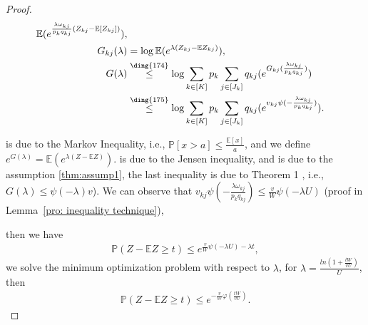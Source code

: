 \documentclass{article}
\def\eE{\mathbb{E}}
\def\pP{\mathbb{P}}
\def\leqthree{\overset{\text{\ding{174}}}{\leq}}
\def\leqfour{\overset{\text{\ding{175}}}{\leq}}
\begin{document}
\begin{proof}
\begin{align*}
        \eE(e^{\frac{\lambda \omega_{kj}}{p_k q_{kj}}(Z_{kj}- \eE [Z_{kj}]) }) ,\\   
        G_{kj}(\lambda ) & = \log \eE (e^{\lambda (Z_{kj}- \eE Z_{kj})}), \\
        G(\lambda ) & \leqthree \log \sum_{k \in [K]}p_k\sum_{j \in [J_k]}q_{kj} (e^{ G_{kj} ({\frac{\lambda \omega_{kj}}{p_k q_{kj}} })}) \\
        & \leqfour \log \sum_{k \in [K]}p_k\sum_{j \in [J_k]}q_{kj} (e^{ v_{kj} \psi (-{\frac{\lambda \omega_{kj}}{p_k q_{kj}} })}).
    \end{align*}

 is due to the Markov Inequality, i.e., $\pP [x > a] \leq \frac{\eE[x]}{a}$, and we define $e^{G(\lambda) } = \eE (e^{\lambda (Z - \eE Z)}) $.  is due to the Jensen inequality, and  is due to the assumption \ref{thm:assump1}, the last inequality  is due to Theorem 1 \cite{bousquet2002bennett,bousquet2003concentration}, i.e., $G(\lambda) \leq \psi(-\lambda)v $). We can observe that $ v_{kj} \psi (-{\frac{\lambda \omega_{kj}}{p_k q_{kj}} }) \leq \frac{v}{W} \psi (-\lambda U)$ (proof in Lemma~\ref{pro: inequality technique}),

then we have
\begin{align}
    \pP(Z-\eE Z \geq t) \leq e^{\frac{v}{W} \psi (-\lambda U) - \lambda t},
\end{align}
we solve the minimum optimization problem with respect to $\lambda$, for $\lambda = \frac{ln(1+\frac{tW}{vU})}{U}$, then
\begin{align}
    \pP (Z- \eE Z \geq t) \leq e^{-\frac{v}{W} \varphi (\frac{tW}{vU})}.
\end{align}



\end{proof}
\end{document}
